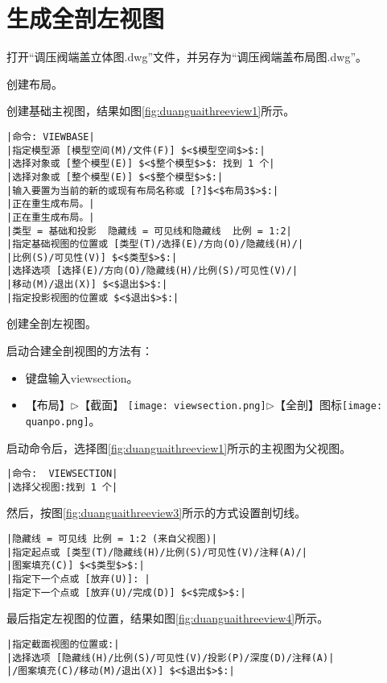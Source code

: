 \section{生成全剖左视图}
\begin{procedure}
\item 打开“调压阀端盖立体图.dwg”文件，并另存为“调压阀端盖布局图.dwg”。
\item 创建布局。
\item 创建基础主视图，结果如图\ref{fig:duanguaithreeview1}所示。
\begin{lstlisting}
|命令: VIEWBASE|
|指定模型源 [模型空间(M)/文件(F)] $<$模型空间$>$:|
|选择对象或 [整个模型(E)] $<$整个模型$>$: 找到 1 个|
|选择对象或 [整个模型(E)] $<$整个模型$>$:|
|输入要置为当前的新的或现有布局名称或 [?]$<$布局3$>$:|
|正在重生成布局。|
|正在重生成布局。|
|类型 = 基础和投影  隐藏线 = 可见线和隐藏线  比例 = 1:2|
|指定基础视图的位置或 [类型(T)/选择(E)/方向(O)/隐藏线(H)/|
|比例(S)/可见性(V)] $<$类型$>$:|
|选择选项 [选择(E)/方向(O)/隐藏线(H)/比例(S)/可见性(V)/|
|移动(M)/退出(X)] $<$退出$>$:|
|指定投影视图的位置或 $<$退出$>$:|
\end{lstlisting}
\begin{figure}[htbp]
\centering
\begin{floatrow}[3]
\end{floatrow}
\end{figure}
\item 创建全剖左视图。

启动合建全剖视图的方法有：
\begin{itemize}
\item 键盘输入viewsection。
\item 【布局】$\triangleright$【截面】
\texttt{[image: viewsection.png]}$\triangleright$【全剖】图标\texttt{[image: quanpo.png]}。
\end{itemize}
启动命令后，选择图\ref{fig:duanguaithreeview1}所示的主视图为父视图。
\begin{lstlisting}
|命令:  VIEWSECTION|
|选择父视图:找到 1 个|
\end{lstlisting}

然后，按图\ref{fig:duanguaithreeview3}所示的方式设置剖切线。
\begin{lstlisting}
|隐藏线 = 可见线 比例 = 1:2 (来自父视图)|
|指定起点或 [类型(T)/隐藏线(H)/比例(S)/可见性(V)/注释(A)/|
|图案填充(C)] $<$类型$>$:|
|指定下一个点或 [放弃(U)]: |
|指定下一个点或 [放弃(U)/完成(D)] $<$完成$>$:|
\end{lstlisting}
最后指定左视图的位置，结果如图\ref{fig:duanguaithreeview4}所示。
\begin{lstlisting}
|指定截面视图的位置或:|
|选择选项 [隐藏线(H)/比例(S)/可见性(V)/投影(P)/深度(D)/注释(A)|
|/图案填充(C)/移动(M)/退出(X)] $<$退出$>$:|
\end{lstlisting}
\end{procedure}
\endinput